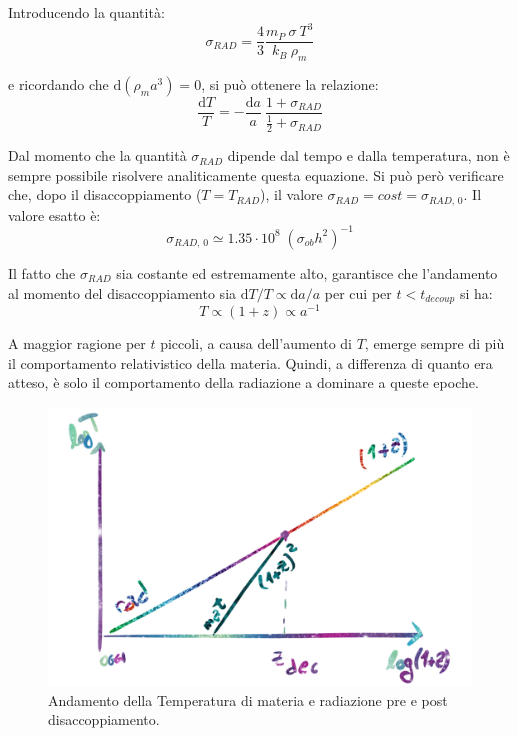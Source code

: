 Introducendo la quantità:
\begin{equation}
    \sigma_{RAD}= \frac{4}{3} \frac{m_P ~\sigma ~T^3}{k_B ~\rho_m}
\end{equation}

e ricordando che $\mathrm{d} (\rho_m a^3) = 0$, si può ottenere la relazione:
\begin{equation}
\frac{ \mathrm{d}T}{T}= - \frac{ \mathrm{d}a}{a} \: \frac{1+\sigma_{RAD}}{\frac{1}{2} +\sigma_{RAD}}
\end{equation}

Dal momento che la quantità $\sigma_{RAD}$ dipende dal tempo e dalla temperatura, non è sempre possibile risolvere analiticamente questa equazione. Si può però verificare che, dopo il disaccoppiamento ($T=T_{RAD}$), il valore $\sigma_{RAD}=cost=\sigma_{RAD, \, 0}$. Il valore esatto è:
\begin{equation*}
    \sigma_{RAD, \, 0} \simeq 1.35 \cdot 10^8 \; (\sigma_{ob}h^2)^{-1}
\end{equation*}

Il fatto che $\sigma_{RAD}$ sia costante ed estremamente alto, garantisce che l'andamento al momento del disaccoppiamento sia $\mathrm{d}T / T \propto \mathrm{d}a / a$ per cui per $t<t_{decoup}$ si ha: 
\begin{equation}
T \propto (1+z) \propto a^{-1} 
\end{equation}

A maggior ragione per $t$ piccoli, a causa dell'aumento di $T$, emerge sempre di più il comportamento relativistico della materia. Quindi, a differenza di quanto era atteso, è solo il comportamento della radiazione a dominare a queste epoche.
\begin{figure}[h]
    \centering
    \includegraphics[width=.8\textwidth]{Pictures/3/logT-z.png}
    \caption{Andamento della Temperatura di materia e radiazione pre e post disaccoppiamento.}
    \label{fig:3logzt}
\end{figure}

